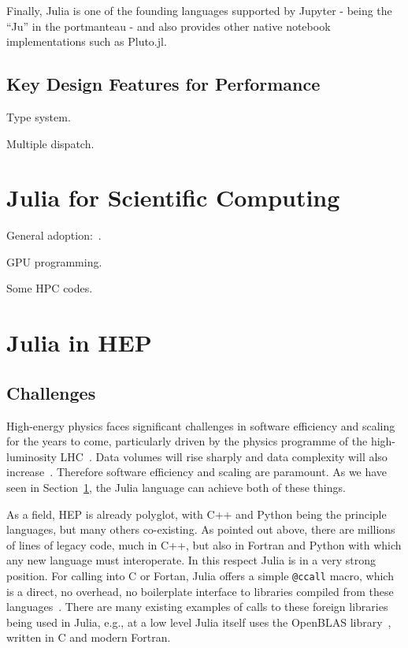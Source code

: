 \documentclass{webofc}
\begin{document}
Finally, Julia is one of the founding languages supported by Jupyter - being the
``Ju'' in the portmanteau - and also provides other native notebook
implementations such as Pluto.jl. 

\subsection{Key Design Features for Performance}

Type system.

Multiple dispatch.

\section{Julia for Scientific Computing}
\label{sec:juliascicomp}

General adoption:~\cite{perkel-julia-science}.

GPU programming.

Some HPC codes.

\section{Julia in HEP}

\subsection{Challenges}

High-energy physics faces significant challenges in software efficiency and
scaling for the years to come, particularly driven by the physics programme of
the high-luminosity LHC~\cite{hsfcwp}. Data volumes will rise sharply and data
complexity will also
increase~\cite{CERN-LHCC-2022-005,Software:2815292,Valassi2021}. Therefore
software efficiency and scaling are paramount. As we have seen in
Section~\ref{sec:juliascicomp}, the Julia language can achieve both of these
things.

As a field, HEP is already polyglot, with C++ and Python being the principle
languages, but many others co-existing. As pointed out above, there are millions
of lines of legacy code, much in C++, but also in Fortran and Python with which
any new language must interoperate. In this respect Julia is in a very strong
position. For calling into C or Fortan, Julia offers a simple \texttt{@ccall}
macro, which is a direct, no overhead, no boilerplate interface to libraries
compiled from these languages~\cite{JuliaManualCCall}. There are many existing
examples of calls to these foreign libraries being used in Julia, e.g., at a low
level Julia itself uses the OpenBLAS library~\cite{6877458}, written in C and
modern Fortran. 
\end{document}
